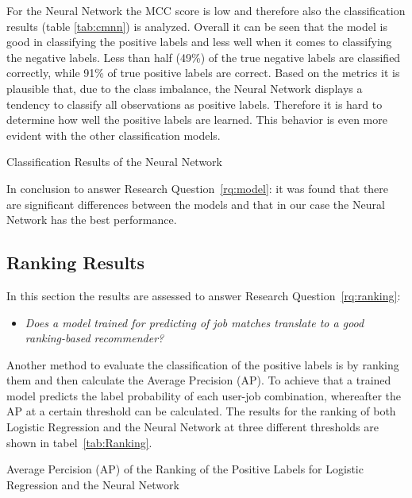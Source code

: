 For the Neural Network the MCC score is low and therefore also the classification results (table \ref{tab:cmnn}) is analyzed.
Overall it can be seen that the model is good in classifying the positive labels and less well when it comes to classifying the negative labels.
Less than half (49\%) of the true negative labels are classified correctly, while 91\% of true positive labels are correct.
Based on the metrics it is plausible that, due to the class imbalance, the Neural Network displays a tendency to classify all observations as positive labels.
Therefore it is hard to determine how well the positive labels are learned.
This behavior is even more evident with the other classification models.

\begin{table}[h]
\begin{footnotesize}

\end{footnotesize}
\caption{\label{tab:cmnn} \footnotesize{Classification Results of the Neural Network}}
\end{table}

In conclusion to answer Research Question~\ref{rq:model}: it was found that there are significant differences between the models and that in our case the Neural Network has the best performance.

\subsection{Ranking Results}
\label{ssec:rr}

In this section the results are assessed to answer Research Question~\ref{rq:ranking}:
\begin{itemize}
	\item[] \em Does a model trained for predicting of job matches translate to a good ranking-based recommender?
\end{itemize}

\noindent Another method to evaluate the classification of the positive labels is by ranking them and then calculate the Average Precision (AP).
To achieve that a trained model predicts the label probability of each user-job combination, whereafter the AP at a certain threshold can be calculated.
The results for the ranking of both Logistic Regression and the Neural Network at three different thresholds are shown in tabel~\ref{tab:Ranking}.

\begin{table}[H]
\begin{footnotesize}

\end{footnotesize}
\caption{\footnotesize{\label{tab:Ranking} Average Percision (AP) of the Ranking of the Positive Labels for Logistic Regression and the Neural Network}}
\end{table}

